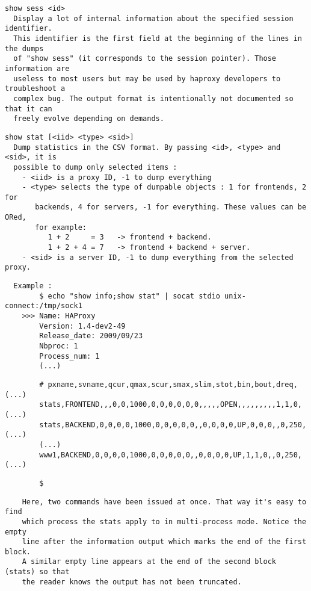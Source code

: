 \begin{verbatim}
show sess <id>
  Display a lot of internal information about the specified session identifier.
  This identifier is the first field at the beginning of the lines in the dumps
  of "show sess" (it corresponds to the session pointer). Those information are
  useless to most users but may be used by haproxy developers to troubleshoot a
  complex bug. The output format is intentionally not documented so that it can
  freely evolve depending on demands.
\end{verbatim}

\begin{verbatim}
show stat [<iid> <type> <sid>]
  Dump statistics in the CSV format. By passing <id>, <type> and <sid>, it is
  possible to dump only selected items :
    - <iid> is a proxy ID, -1 to dump everything
    - <type> selects the type of dumpable objects : 1 for frontends, 2 for
       backends, 4 for servers, -1 for everything. These values can be ORed,
       for example:
          1 + 2     = 3   -> frontend + backend.
          1 + 2 + 4 = 7   -> frontend + backend + server.
    - <sid> is a server ID, -1 to dump everything from the selected proxy.
\end{verbatim}

\begin{verbatim}
  Example :
        $ echo "show info;show stat" | socat stdio unix-connect:/tmp/sock1
    >>> Name: HAProxy
        Version: 1.4-dev2-49
        Release_date: 2009/09/23
        Nbproc: 1
        Process_num: 1
        (...)
\end{verbatim}

\begin{verbatim}
        # pxname,svname,qcur,qmax,scur,smax,slim,stot,bin,bout,dreq,  (...)
        stats,FRONTEND,,,0,0,1000,0,0,0,0,0,0,,,,,OPEN,,,,,,,,,1,1,0, (...)
        stats,BACKEND,0,0,0,0,1000,0,0,0,0,0,,0,0,0,0,UP,0,0,0,,0,250,(...)
        (...)
        www1,BACKEND,0,0,0,0,1000,0,0,0,0,0,,0,0,0,0,UP,1,1,0,,0,250, (...)
\end{verbatim}

\begin{verbatim}
        $
\end{verbatim}

\begin{verbatim}
    Here, two commands have been issued at once. That way it's easy to find
    which process the stats apply to in multi-process mode. Notice the empty
    line after the information output which marks the end of the first block.
    A similar empty line appears at the end of the second block (stats) so that
    the reader knows the output has not been truncated.
\end{verbatim}

